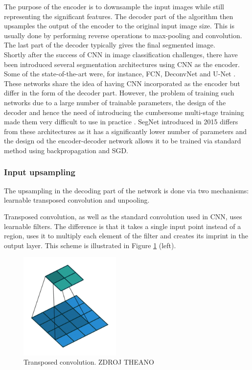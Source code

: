 The purpose of the encoder is to downsample the input images while still representing the significant features. The decoder part of the algorithm then upsamples the output of the encoder to the original input image size. This is usually done by performing reverse operations to max-pooling and convolution. The last part of the decoder typically gives the final segmented image. \\

Shortly after the success of CNN in image classification challenges, there have been introduced several segmentation architectures using CNN as the encoder. Some of the state-of-the-art were, for instance, FCN, DeconvNet and U-Net \cite{segnet}. These networks share the idea of having CNN incorporated as the encoder but differ in the form
of the decoder part. However, the problem of training such networks due to a large number of trainable parameters, the design of the decoder and hence the need of introducing the cumbersome multi-stage training made them very difficult to use in practice \cite{segnet}. SegNet \cite{segnet} introduced in 2015 differs from these architectures as it has a significantly lower number of parameters and the design od the encoder-decoder network allows it to be trained via standard method using backpropagation and SGD.

\subsubsection{Input upsampling}

The upsampling in the decoding part of the network is done via two mechanisms: learnable transposed convolution and unpooling. 

Transposed convolution, as well as the standard convolution used in CNN, uses learnable filters. The difference is that it takes a single input point instead of a region, uses it to multiply each element of the filter and creates its imprint in the output layer. This scheme is illustrated in Figure \ref{transposed} (left).

\vspace{4mm}
\begin{figure}[h]
	\begin{center}
		\includegraphics*[width=5cm, keepaspectratio]{obr/transposed.png}
	\end{center}
	\vspace{4mm}
	\caption{Transposed convolution. ZDROJ THEANO} 
	\label{transposed}
\end{figure}

